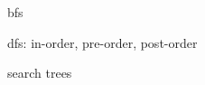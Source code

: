 
\begin{frame}{}
  \begin{center}
  \end{center}
\end{frame}

\begin{frame}{}
  \begin{definition}
  \end{definition}
\end{frame}

\begin{frame}{}
    bfs
\end{frame}

\begin{frame}{}
    dfs: in-order, pre-order, post-order
\end{frame}

\begin{frame}{}
  search trees
\end{frame}


